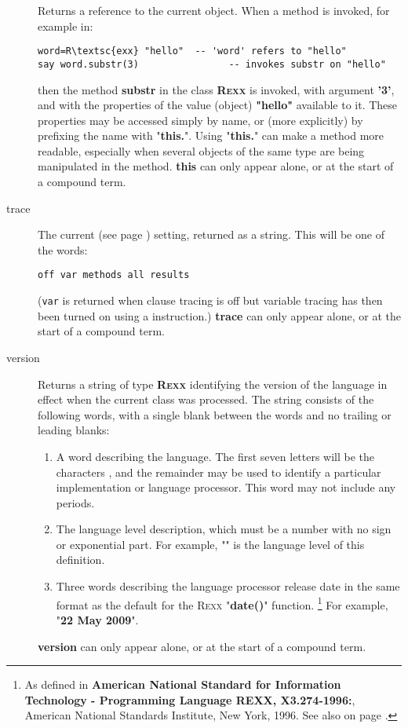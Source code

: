 \begin{description}
Returns a reference to the current object.
When a method is invoked, for example in:
\begin{lstlisting}
word=R\textsc{exx} "hello"  -- 'word' refers to "hello"
say word.substr(3)                -- invokes substr on "hello"
\end{lstlisting}
then the method \textbf{substr} in the class \textbf{R\textsc{exx}} is
invoked, with argument \textbf{'3'}, and with the properties of the
value (object) \textbf{"hello"} available to it.
These properties may be accessed simply by name, or (more explicitly) by
prefixing the name with "\textbf{this.}".
Using "\textbf{this.}" can make a method more readable,
especially when several objects of the same type are being manipulated
in the method.
 \textbf{this} can only appear alone, or at the start of a
compound term.
\item[trace]\label{refswtrace}

The current   (see page \pageref{reftrace})  setting,
returned as a \nr{} string.
This will be one of the words:
\begin{lstlisting}
off var methods all results
\end{lstlisting}

(\texttt{var} is returned when clause tracing is off but variable
tracing has then been turned on using a  instruction.)
 \textbf{trace} can only appear alone, or at the start of a
compound term.
\item[version]\label{refswvers}
 
Returns a string of type \textbf{R\textsc{exx}} identifying the version of the
\nr{} language in effect when the current class was processed.
The string consists of the following words, with a single blank between
the words and no trailing or leading blanks:
\begin{enumerate}
\item A word describing the language.  The first seven letters will be the
characters \textbf{\nr{}}, and the remainder may be used to identify
a particular implementation or language processor.
This word may not include any periods.
\item 
The language level description, which must be a number with no sign or
exponential part.
For example, "\textbf{}" is the language level of this
definition.
\item 
Three words describing the language processor release date in
the same format as the default for the R\textsc{exx} "\textbf{date()}"
function.
\footnote{
As defined in \textbf{American National Standard for Information
Technology - Programming Language REXX, X3.274-1996:}, American
National Standards Institute, New York, 1996. See also
 on page \pageref{refrexxdate}.
}
For example, "\textbf{22 May 2009}".
\end{enumerate}
 \textbf{version} can only appear alone, or at the start of a
compound term.
\end{description}
